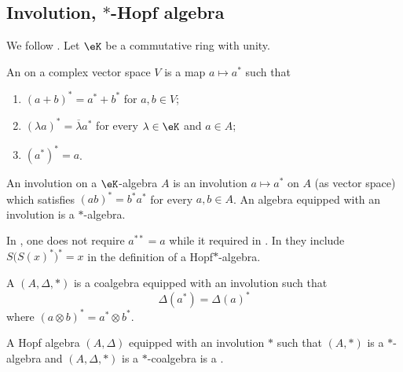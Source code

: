 \subsection{Involution, $*$-Hopf algebra}
\label{subsecHopfInvolution}

We follow \cite{TimmernannInvitation}. Let \( \eK\) be a commutative ring with unity.

\begin{definition}
	An  on a complex vector space \( V\) is a map \( a\mapsto a^*\) such that

	\begin{enumerate}
		\item
		      \( (a+b)^*=a^*+b^*\) for \( a,b\in V\);
		\item
		      \( (\lambda a)^*=\overline{ \lambda }a^*\) for every \( \lambda\in\eK\) and \( a\in A\);
		\item
		      \( (a^*)^*=a\).
	\end{enumerate}
	An involution on a \( \eK\)-algebra \( A\) is an involution \( a\mapsto a^*\) on \( A\) (as vector space) which satisfies \( (ab)^*=b^*a^*\) for every \( a,b\in A\). An algebra equipped with an involution is a \( *\)-algebra.
\end{definition}

\begin{probleme}
	In \cite{SoibelmanI}, one does not require \( a^{**}=a\) while it required in \cite{TimmernannInvitation}. In \cite{Kassel} they include \( S\big( S(x)^* \big)^*=x\) in the definition of a Hopf\( *\)-algebra.
\end{probleme}

\begin{definition}
	A  \( (A,\Delta,*)\) is a coalgebra equipped with an involution such that
	\begin{equation}
		\Delta(a^*)=\Delta(a)^*
	\end{equation}
	where \( (a\otimes b)^*=a^*\otimes b^*\).
\end{definition}

\begin{definition}
	A Hopf algebra \( (A,\Delta)\) equipped with an involution \( *\) such that \( (A,*)\) is a \( *\)-algebra and \( (A,\Delta,*)\) is a \( *\)-coalgebra is a .
\end{definition}


